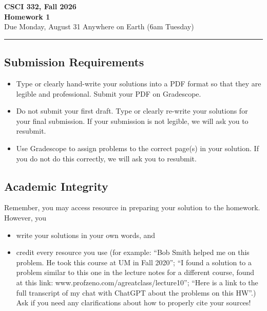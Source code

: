 \documentclass[11pt]{article}
\begin{document}
\begin{center}
\Large\textbf{CSCI 332, Fall 2026}%
\\
\LARGE\textbf{Homework 1}%
\\[0.5ex]
\large Due Monday, August 31 Anywhere on Earth (6am Tuesday)
\end{center}

\bigskip
\hrule
\bigskip

\subsection*{Submission Requirements}
\begin{itemize}
    \item Type or clearly hand-write your solutions into a PDF format so that they are legible and professional. Submit your PDF on Gradescope. 
    \item Do not submit your first draft. Type or clearly re-write your solutions for your final submission. If your submission is not legible, we will ask you to resubmit.
    \item Use Gradescope to assign problems to the correct page(s) in your solution. If you do not do this correctly, we will ask you to resubmit.
\end{itemize}

\subsection*{Academic Integrity}

Remember, you may access  resource in preparing your solution to the homework. However, you 
\begin{itemize}
    \item write your solutions in your own words, and
    \item credit every resource you use (for example: ``Bob Smith helped me on
    this problem. He took this course at UM in Fall 2020''; ``I found a solution
    to a problem similar to this one in the lecture notes for a different
    course, found at this link: www.profzeno.com/agreatclass/lecture10''; ``Here is a link to the full transcript of my chat with ChatGPT about the problems on this HW''.)
    Ask if you need any clarifications about how to properly cite your sources!
\end{itemize}




\newpage
\end{document}
